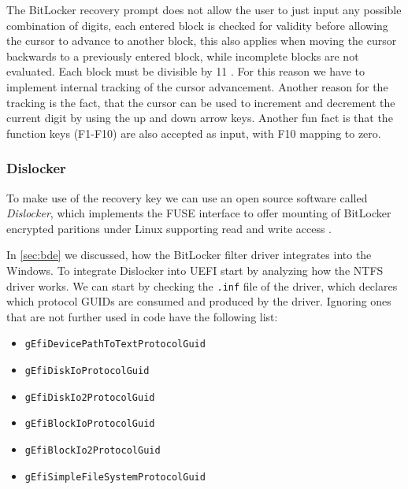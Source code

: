 

The BitLocker recovery prompt does not allow the user to just input any possible combination of digits, each entered block is checked for validity before allowing the cursor to advance to another block, this also applies when moving the cursor backwards to a previously entered block, while incomplete blocks are not evaluated.
Each block must be divisible by 11 \cite[9. BitLocker Key Recovery]{windows-internals-6-part2}.
For this reason we have to implement internal tracking of the cursor advancement.
Another reason for the tracking is the fact, that the cursor can be used to increment and decrement the current digit by using the up and down arrow keys. Another fun fact is that the function keys (F1-F10) are also accepted as input, with F10 mapping to zero.

\subsubsection{Dislocker}

To make use of the recovery key we can use an open source software called \emph{Dislocker}, which implements the \ac{FUSE} interface to offer mounting of BitLocker encrypted paritions under Linux supporting read and write access \cite{dislocker}.

In \autoref{sec:bde} we discussed, how the BitLocker filter driver integrates into the Windows.
To integrate Dislocker into \ac{UEFI} start by analyzing how the \ac{NTFS} driver works.
We can start by checking the \lstinline{.inf} file of the driver, which declares which protocol \acp{GUID} are consumed and produced by the driver.
Ignoring ones that are not further used in code have the following list:

\begin{itemize}
    \item \lstinline{gEfiDevicePathToTextProtocolGuid}
    \item \lstinline{gEfiDiskIoProtocolGuid}
    \item \lstinline{gEfiDiskIo2ProtocolGuid}
    \item \lstinline{gEfiBlockIoProtocolGuid}
    \item \lstinline{gEfiBlockIo2ProtocolGuid}
    \item \lstinline{gEfiSimpleFileSystemProtocolGuid}
\end{itemize}

